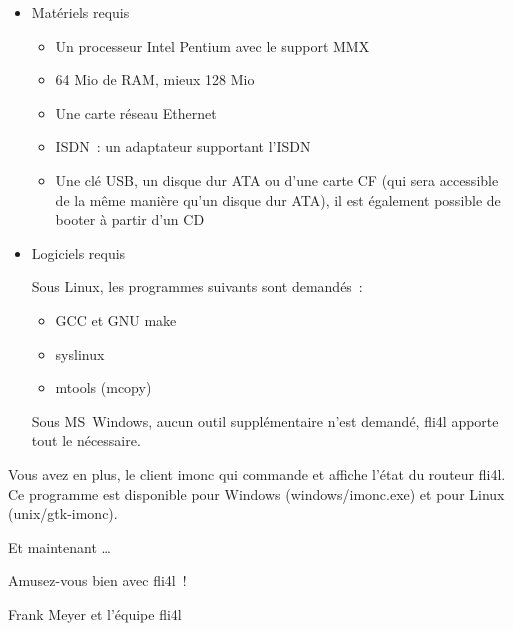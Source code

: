 \begin{itemize}
\item Matériels requis

\begin{itemize}
\item Un processeur Intel Pentium avec le support MMX
\item 64 Mio de RAM, mieux 128 Mio
\item Une carte réseau Ethernet
\item ISDN~: un adaptateur supportant l'ISDN
\item Une clé USB, un disque dur ATA ou d'une carte CF (qui sera accessible de
      la même manière qu'un disque dur ATA), il est également possible de booter
      à partir d'un CD
\end{itemize}

\item Logiciels requis

Sous Linux, les programmes suivants sont demandés~:

\begin{itemize}
\item GCC et GNU make
\item syslinux
\item mtools (mcopy)
\end{itemize}

Sous MS~Windows, aucun outil supplémentaire n'est demandé, fli4l apporte tout
le nécessaire.
\end{itemize}

Vous avez en plus, le client imonc qui commande et affiche l'état du routeur
fli4l. Ce programme est disponible pour Windows (windows/imonc.exe) et pour
Linux (unix/gtk-imonc).

Et maintenant \ldots \bigskip

Amusez-vous bien avec fli4l~!\bigskip

Frank Meyer et l'équipe fli4l

